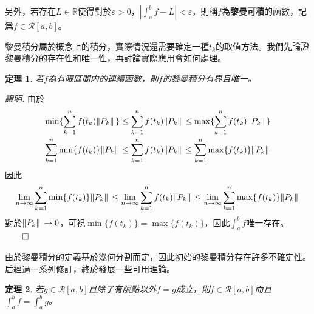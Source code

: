 \documentclass[12pt]{article}
\newtheorem*{theorem}{定理}
\renewenvironment*{proof}{\textit{證明.}}{\hfill$\qed$}
\begin{document}
    另外，若存在$L\in \mathbb{R}$使得對於$\varepsilon>0$，$|\int_a^b f - L| < \varepsilon$，則稱$f$為\textbf{黎曼可積}的函數，記爲$f\in\mathcal{R}[a,b]$。

    黎曼積分屬於概念上的積分，實際情況還需要確定一種$t_k$的取值方法。我們先論證黎曼積分的存在性和唯一性，再討論實際應用會如何處理。

    \begin{theorem}
        若$f$為有限區間内的連續函數，則$f$的黎曼積分有界且唯一。
    \end{theorem}
    \begin{proof}
        由於\begin{align*}
            \min\{\sum_{k=1}^{n}f(t_k)\norm*{P_k}\}\leq \sum_{k=1}^{n}f(t_k)\norm*{P_k}\leq \max\{\sum_{k=1}^{n}f(t_k)\norm*{P_k}\}\\
            \sum_{k=1}^{n}\min\{f(t_k)\}\norm*{P_k}\leq \sum_{k=1}^{n}f(t_k)\norm*{P_k}\leq \sum_{k=1}^{n}\max\{f(t_k)\}\norm*{P_k}
        \end{align*}
        因此\begin{align*}
            \lim_{n\to\infty}\sum_{k=1}^{n}\min\{f(t_k)\}\norm*{P_k}\leq \lim_{n\to\infty}\sum_{k=1}^{n}f(t_k)\norm*{P_k}\leq \lim_{n\to\infty}\sum_{k=1}^{n}\max\{f(t_k)\}\norm*{P_k}
        \end{align*}
        對於$\norm*{P_k}\to 0$，可視$\min\{f(t_k)\}=\max\{f(t_k)\}$，因此$\int_{a}^{b}f$唯一存在。
    \end{proof}

    由於黎曼積分的定義基於幾何分割而定，因此初始的黎曼積分存在許多不確定性。后經過一系列修訂，終於發展一些可用理論。

    \begin{theorem}
        若$g\in\mathcal{R}[a,b]$且除了有限點以外$f=g$成立，則$f\in\mathcal{R}[a,b]$而且$\int_a^b f = \int_a^b g$。
    \end{theorem}
\end{document}
